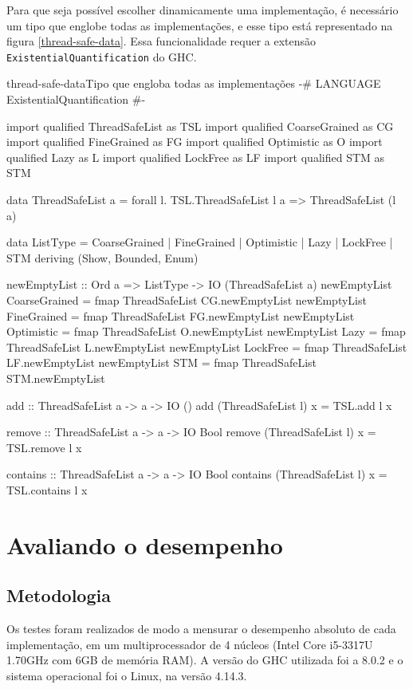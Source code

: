\documentclass[a4paper,12pt,oldfontcommands]{abntex2}
\begin{document}
Para que seja possível escolher dinamicamente uma implementação, é necessário um tipo que englobe todas as implementações, e esse tipo está representado na figura \ref{thread-safe-data}. Essa funcionalidade requer a extensão \texttt{ExistentialQuantification} do GHC.

\begin{code}{thread-safe-data}{Tipo que engloba todas as implementações}
{-# LANGUAGE ExistentialQuantification #-}

import qualified ThreadSafeList as TSL
import qualified CoarseGrained as CG
import qualified FineGrained as FG
import qualified Optimistic as O
import qualified Lazy as L
import qualified LockFree as LF
import qualified STM as STM

data ThreadSafeList a =
    forall l. TSL.ThreadSafeList l a => ThreadSafeList (l a)

data ListType = CoarseGrained
    | FineGrained
    | Optimistic
    | Lazy
    | LockFree
    | STM
    deriving (Show, Bounded, Enum)

newEmptyList :: Ord a => ListType -> IO (ThreadSafeList a)
newEmptyList CoarseGrained = fmap ThreadSafeList CG.newEmptyList
newEmptyList FineGrained = fmap ThreadSafeList FG.newEmptyList
newEmptyList Optimistic = fmap ThreadSafeList O.newEmptyList
newEmptyList Lazy = fmap ThreadSafeList L.newEmptyList
newEmptyList LockFree = fmap ThreadSafeList LF.newEmptyList
newEmptyList STM = fmap ThreadSafeList STM.newEmptyList

add :: ThreadSafeList a -> a -> IO ()
add (ThreadSafeList l) x = TSL.add l x

remove :: ThreadSafeList a -> a -> IO Bool
remove (ThreadSafeList l) x = TSL.remove l x

contains :: ThreadSafeList a -> a -> IO Bool
contains (ThreadSafeList l) x = TSL.contains l x
\end{code}

\chapter{Avaliando o desempenho}\label{chapter-analysis}

\section{Metodologia}

Os testes foram realizados de modo a mensurar o desempenho absoluto de cada implementação, em um multiprocessador de 4 núcleos (Intel Core i5-3317U 1.70GHz com 6GB de memória RAM). A versão do GHC utilizada foi a 8.0.2 e o sistema operacional foi o Linux, na versão 4.14.3.
\end{document}
